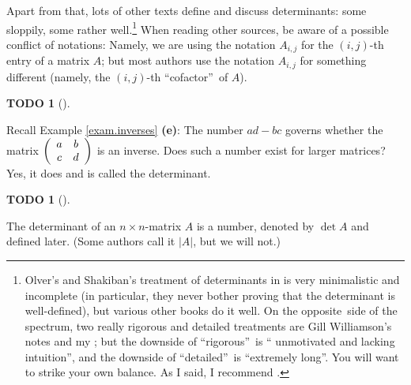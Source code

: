 \documentclass[numbers=enddot,12pt,final,onecolumn,notitlepage]{scrartcl}%
\theoremstyle{definition}
\newtheorem{quest}[theo]{TODO}
\newenvironment{todo}[1][]
{\begin{quest}[#1]\begin{leftbar}}
{\end{leftbar}\end{quest}}
\begin{document}
Apart from that, lots of other texts define and discuss determinants: some
sloppily, some rather well.\footnote{Olver's and Shakiban's treatment of
determinants in \cite[\S 1.9]{OlvSha06} is very minimalistic and incomplete
(in particular, they never bother proving that the determinant is
well-defined), but various other books do it well. On the opposite\ side of
the spectrum, two really rigorous and detailed treatments are Gill
Williamson's notes \cite[Chapter 3]{Gill} and my \cite{detnotes}; but the
downside of \textquotedblleft rigorous\textquotedblright\ is \textquotedblleft
unmotivated and lacking intuition\textquotedblright, and the downside of
\textquotedblleft detailed\textquotedblright\ is \textquotedblleft extremely
long\textquotedblright. You will want to strike your own balance. As I said, I
recommend \cite[Chapter 8]{LaNaSc16}.} When reading other sources, be aware of
a possible conflict of notations: Namely, we are using the notation $A_{i,j}$
for the $\left(  i,j\right)  $-th entry of a matrix $A$; but most authors use
the notation $A_{i,j}$ for something different (namely, the $\left(
i,j\right)  $-th \textquotedblleft cofactor\textquotedblright\ of $A$).

\begin{todo}
Recall Example \ref{exam.inverses} \textbf{(e)}: The number $ad-bc$ governs
whether the matrix $\left(
\begin{array}
[c]{cc}%
a & b\\
c & d
\end{array}
\right)  $ is an inverse. Does such a number exist for larger matrices? Yes,
it does and is called the determinant.
\end{todo}

\begin{todo}
The determinant of an $n\times n$-matrix $A$ is a number, denoted by $\det A$
and defined later. (Some authors call it $\left\vert A\right\vert $, but we
will not.)
\end{todo}
\end{document}
